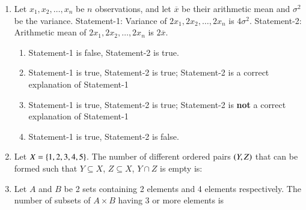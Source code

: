 \documentclass[journal,12pt,twocolumn]{IEEEtran}
\theoremstyle{remark}
\begin{document}
\begin{enumerate}
    \item Let $x_1, x_2, \dots, x_n$ be $n$ observations, and let $\overline{x}$ be their arithmetic mean and $\sigma^{2}$ be the variance.\newline
    Statement-1: Variance of $2x_1, 2x_2, \dots, 2x_n$ is $4\sigma^{2}$.\newline
    Statement-2: Arithmetic mean of $2x_1, 2x_2, \dots, 2x_n$ is $2\overline{x}$.
    
    \hfill{}
    \begin{enumerate}
        \item Statement-1 is false, Statement-2 is true.
        \item Statement-1 is true, Statement-2 is true; Statement-2 is a correct explanation of Statement-1
        \item Statement-1 is true, Statement-2 is true; Statement-2 is \textbf{not} a correct explanation of Statement-1
        \item Statement-1 is true, Statement-2 is false.
    \end{enumerate}
    
    \item Let $X = \left\{1, 2, 3, 4, 5\right\}$. The number of different ordered pairs $\left(Y, Z\right)$ that can be formed such that $Y \subseteq X$, $Z \subseteq X$, $Y \cap Z$ is empty is:
    
    \hfill{}
    \begin{enumerate}
    \end{enumerate}
    
    \item Let $A$ and $B$ be 2 sets containing 2 elements and 4 elements respectively. The number of subsets of $A \times B$ having 3 or more elements is
    
    \hfill{}
    \begin{enumerate}
    \end{enumerate}
    

\end{enumerate}
\end{document}
